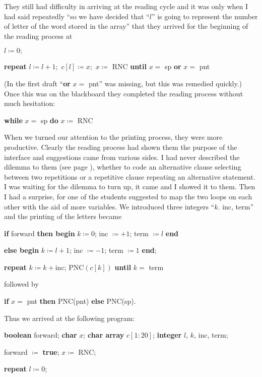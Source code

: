 They still had difficulty in arriving at the reading cycle and it was only when I had said repeatedly ``so we have decided that ``$l$'' is going to represent the number of letter of the word stored in the array'' that they arrived for the beginning of the reading process at

\quad $l \coloneq 0; $

\quad \textbf{repeat} $l \coloneq l + 1;$ $c[l] \coloneq x;$ $x\coloneq$ RNC \textbf{until} $x =$ sp \textbf{or} $x =$ pnt

\noindent
(In the first draft ``\textbf{or} $x =$ pnt'' was missing, but this was remedied quickly.) Once this was on the blackboard they completed the reading process without much hesitation:

\quad \textbf{while} $x =$ sp \textbf{do} $x\coloneq$ RNC

When we turned our attention to the printing process, they were more productive. Clearly the reading process had shown them the purpose of the interface and suggestions came from various sides. I had never described the dilemma to them (see page \pageref{pg:dilema}), whether to code an alternative clause selecting between two repetitions or a repetitive clause repeating an alternative statement. I was waiting for the dilemma to turn up, it came and I showed it to them. Then I had a surprise, for one of the students suggested to map the two loops on each other with the aid of more variables. We introduced three integers ``$k$. inc, term'' and the printing of the letters became

\quad \textbf{if} forward \textbf{then begin} $k \coloneq 0$; inc $\coloneq + 1$; term $\coloneq l$ \textbf{end}

\tabto{5.8em}\quad \textbf{else begin} $k \coloneq l + 1$; inc $\coloneq - 1$; term $\coloneq 1$ \textbf{end};

\quad \textbf{repeat} $k \coloneq k + \text{inc}$; $\text{PNC}(c[k])$ \textbf{until} $k =$ term

\noindent
followed by

\quad \textbf{if} $x =$ pnt \textbf{then} PNC(pnt) \textbf{else} PNC(sp).

Thus we arrived at the following program:

\quad \textbf{boolean} forward; \textbf{char} $x$; \textbf{char array} $c[1:20]$; \textbf{integer} $l$, $k$, inc, term;

\quad forward $\coloneq$ \textbf{true}; $x \coloneq$ RNC;

\quad \textbf{repeat} $l \coloneq 0$;

